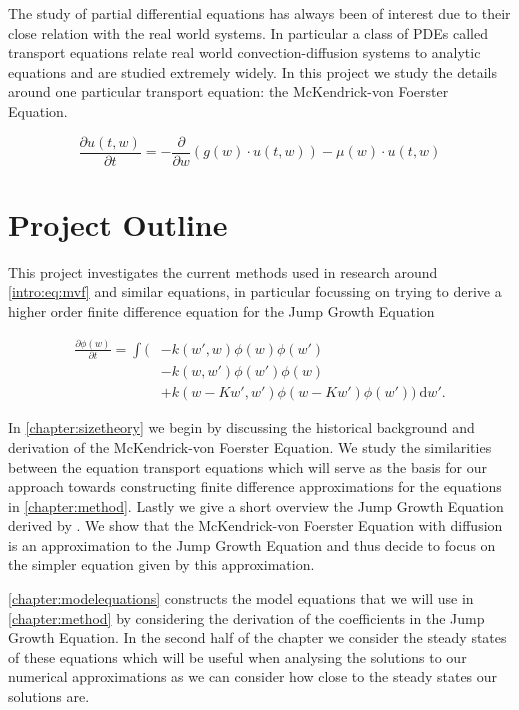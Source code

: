\documentclass[../main]{subfiles}
\begin{document}
  The study of partial differential equations has always been of interest due to their close relation with the real world systems. In particular a class of PDEs called transport equations relate real world convection-diffusion systems to analytic equations and are studied extremely widely. In this project we study the details around one particular transport equation: the McKendrick-von Foerster Equation.

  \begin{equation} \label{intro:eq:mvf}
    \frac{\partial u(t, w)}{\partial t} = - \frac{\partial}{\partial w} \left(g(w) \cdot u(t, w) \right) - \mu(w) \cdot u(t, w)
  \end{equation}

  \section{Project Outline}
  This project investigates the current methods used in research around \autoref{intro:eq:mvf} and similar equations, in particular focussing on trying to derive a higher order finite difference equation for the Jump Growth Equation

  \begin{align}\label{intro:eq:jumpgrowth}
    \frac{\partial \phi(w)}{\partial t}
    = \int ( &- k(w', w) \phi(w)\phi(w') \nonumber \\
    & - k(w, w')\phi(w')\phi(w) \nonumber \\
    & + k(w - Kw', w')\phi(w - Kw')\phi(w')) \: \mathrm{d}w'.
  \end{align}

  In \autoref{chapter:sizetheory} we begin by discussing the historical background and derivation of the McKendrick-von Foerster Equation. We study the similarities between the equation transport equations which will serve as the basis for our approach towards constructing finite difference approximations for the equations in \autoref{chapter:method}. Lastly we give a short overview the Jump Growth Equation derived by \cite{datta2010}. We show that the McKendrick-von Foerster Equation with diffusion is an approximation to the Jump Growth Equation and thus decide to focus on the simpler equation given by this approximation.

  \autoref{chapter:modelequations} constructs the model equations that we will use in \autoref{chapter:method} by considering the derivation of the coefficients in the Jump Growth Equation. In the second half of the chapter we consider the steady states of these equations which will be useful when analysing the solutions to our numerical approximations as we can consider how close to the steady states our solutions are.
\end{document}
